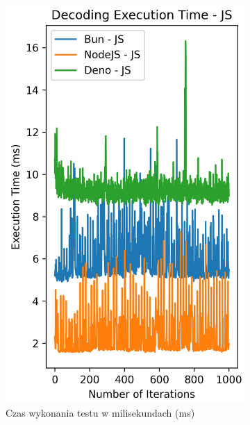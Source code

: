 \begin{figure}[H]
  \centering
  \begin{subfigure}[b]{0.42\textwidth}
    \centering
    \includegraphics[width=\textwidth]{Figures/coding/base64_1000_decoding_js_time.png}
    \caption{Czas wykonania testu w milisekundach (ms)}
    \label{fig:decoding_e2_js_time}
  \end{subfigure}
  \begin{subfigure}[b]{0.42\textwidth}
    \centering

\end{subfigure}
\end{figure}
